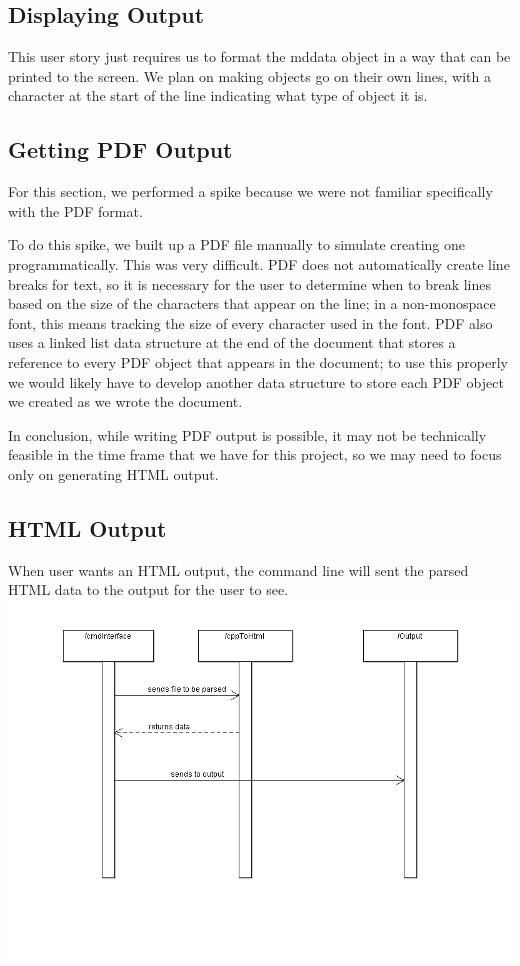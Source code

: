 \subsection{Displaying Output}
This user story just requires us to format the mddata object in a way that can be printed to the screen.
We plan on making objects go on their own lines, with a character at the start of the line indicating what type of object it is.

\subsection{Getting PDF Output}
For this section, we performed a spike because we were not familiar specifically with the PDF format.

To do this spike, we built up a PDF file manually to simulate creating one programmatically. This was very difficult. PDF does not automatically create line breaks for text, so it is necessary for the user to determine when to break lines based on the size of the characters that appear on the line; in a non-monospace font, this means tracking the size of every character used in the font. PDF also uses a linked list data structure at the end of the document that stores a reference to every PDF object that appears in the document; to use this properly we would likely have to develop another data structure to store each PDF object we created as we wrote the document.

In conclusion, while writing PDF output is possible, it may not be technically feasible in the time frame that we have for this project, so we may need to focus only on generating HTML output.

\subsection{HTML Output}
When user wants an HTML output, the command line will sent the parsed HTML data to the output for the user to see. 
\hspace{-6cm}\includegraphics[width=400pt]{images/htmlOut.png}

